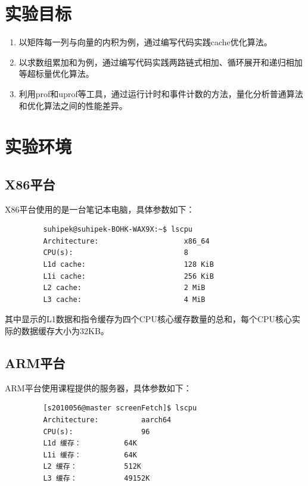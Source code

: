 \documentclass[a4paper]{article}
\begin{document}
\section{实验目标}
   \begin{enumerate}
   \item 以矩阵每一列与向量的内积为例，通过编写代码实践cache优化算法。
   \item 以求数组累加和为例，通过编写代码实践两路链式相加、循环展开和递归相加等超标量优化算法。
   \item 利用prof和uprof等工具，通过运行计时和事件计数的方法，量化分析普通算法和优化算法之间的性能差异。
   \end{enumerate}
\section{实验环境}
   \subsection{X86平台}
      X86平台使用的是一台笔记本电脑，具体参数如下：
      \begin{verbatim}
         suhipek@suhipek-BOHK-WAX9X:~$ lscpu
         Architecture:                    x86_64
         CPU(s):                          8
         L1d cache:                       128 KiB
         L1i cache:                       256 KiB
         L2 cache:                        2 MiB
         L3 cache:                        4 MiB
      \end{verbatim}
      其中显示的L1数据和指令缓存为四个CPU核心缓存数量的总和，每个CPU核心实际的数据缓存大小为32KB。
      \subsection{ARM平台}
      ARM平台使用课程提供的服务器，具体参数如下：
      \begin{verbatim}
         [s2010056@master screenFetch]$ lscpu
         Architecture:          aarch64
         CPU(s):                96
         L1d 缓存：          64K
         L1i 缓存：          64K
         L2 缓存：           512K
         L3 缓存：           49152K
      \end{verbatim}
\newpage
\end{document}
